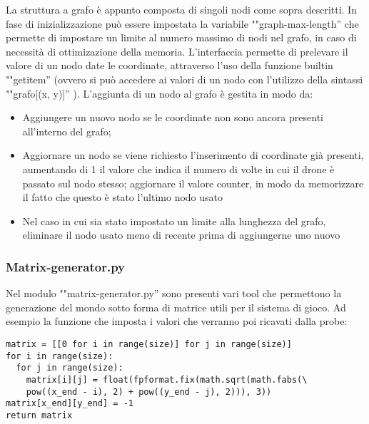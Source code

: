 La struttura a grafo è appunto composta di singoli nodi come sopra descritti. In fase di inizializzazione può essere impostata la variabile ""graph-max-length'' che permette di impostare un limite al numero massimo di nodi nel grafo, in caso di necessità di ottimizazione della memoria. 
L'interfaccia permette di prelevare il valore di un nodo date le coordinate, attraverso l'uso della funzione builtin ""getitem'' (ovvero si può accedere ai valori di un nodo con l'utilizzo della sintassi ""grafo[(x, y)]'' ). L'aggiunta di un nodo al grafo è gestita in modo da:
\begin{itemize}
\item Aggiungere un nuovo nodo se le coordinate non sono ancora presenti all'interno del grafo;

\item Aggiornare un nodo se viene richiesto l'inserimento di coordinate già presenti, aumentando di 1 il valore che indica il numero di volte in cui il drone è passato sul nodo stesso; aggiornare il valore counter, in modo da memorizzare il fatto che questo è stato l'ultimo nodo usato

\item Nel caso in cui sia stato impostato un limite alla lunghezza del grafo, eliminare il nodo usato meno di recente prima di aggiungerne uno nuovo
\end{itemize}
\subsubsection{Matrix-generator.py}
Nel modulo ""matrix-generator.py'' sono presenti vari tool che permettono la generazione del mondo sotto forma di matrice utili per il sistema di gioco. Ad esempio la funzione che imposta i valori che verranno poi ricavati dalla probe:
\begin{verbatim}
matrix = [[0 for i in range(size)] for j in range(size)]
for i in range(size):
  for j in range(size):
    matrix[i][j] = float(fpformat.fix(math.sqrt(math.fabs(\
    pow((x_end - i), 2) + pow((y_end - j), 2))), 3))
matrix[x_end][y_end] = -1
return matrix
\end{verbatim}

